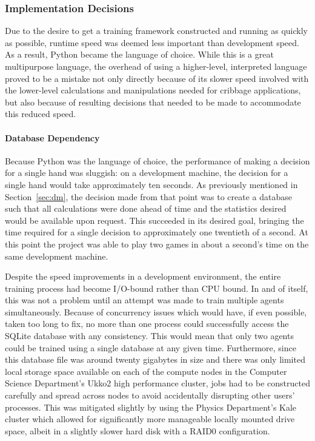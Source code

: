 
\subsubsection*{Implementation Decisions}
\label{sec:disc-future-implementation}

Due to the desire to get a training framework constructed
and running as quickly as possible,
runtime speed was deemed less important than development speed.
%
As a result,
Python became the language of choice.
%
While this is a great multipurpose language,
the overhead of using a higher-level, interpreted language
proved to be a mistake
not only directly because of its slower speed involved with the
lower-level calculations and manipulations needed for cribbage applications,
but also because of resulting decisions that needed to be made to accommodate
this reduced speed.


\paragraph*{Database Dependency}

Because Python was the language of choice,
the performance of making a decision for a single hand was sluggish:
on a development machine,
the decision for a single hand would take approximately ten seconds.
%
As previously mentioned in Section~\ref{sec:dm},
the decision made from that point was to create a database such that all
calculations were done ahead of time
and the statistics desired would be available upon request.
%
This succeeded in its desired goal,
bringing the time required for a single decision to approximately
one twentieth of a second.
%
At this point the project was able to play two games in about a second's time
on the same development machine.

Despite the speed improvements in a development environment,
the entire training process had become I/O-bound rather
than CPU bound.
%
In and of itself,
this was not a problem until an attempt was made to train multiple
agents simultaneously.
%
Because of concurrency issues which would have,
if even possible,
taken too long to fix,
no more than one process could successfully access the SQLite database with any
consistency.
%
This would mean that only two agents could be trained using a single database
at any given time.
%
Furthermore,
since this database file was around twenty gigabytes in size and
there was only limited local storage space available
on each of the compute nodes in the Computer Science Department's Ukko2 high
performance cluster,
jobs had to be constructed carefully and spread across nodes to avoid
accidentally disrupting other users' processes.
%
This was mitigated slightly by using the Physics Department's Kale cluster
which allowed for significantly more manageable locally mounted drive space,
albeit in a slightly slower hard disk with a RAID0 configuration.

